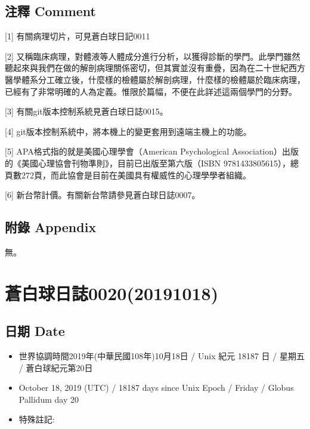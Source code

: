 \documentclass[a5paper, 12pt
]{book}
\providecommand{\tightlist}{%
  \setlength{\itemsep}{0pt}\setlength{\parskip}{0pt}}
\begin{document}
\hypertarget{ux6ce8ux91cb-comment-12}{%
\subsection{注釋 Comment}\label{ux6ce8ux91cb-comment-12}}

{[}1{]} 有關病理切片，可見蒼白球日記0011

{[}2{]}
又稱臨床病理，對體液等人體成分進行分析，以獲得診斷的學門。此學門雖然聽起來與我們在做的解剖病理關係密切，但其實並沒有重疊，因為在二十世紀西方醫學體系分工確立後，什麼樣的檢體屬於解剖病理，什麼樣的檢體屬於臨床病理，已經有了非常明確的人為定義。惟限於篇幅，不便在此詳述這兩個學門的分野。

{[}3{]} 有關git版本控制系統見蒼白球日誌0015。

{[}4{]} git版本控制系統中，將本機上的變更套用到遠端主機上的功能。

{[}5{]} APA格式指的就是美國心理學會（American Psychological
Association）出版的《美國心理協會刊物準則》，目前已出版至第六版（ISBN
9781433805615），總頁數272頁，而此協會是目前在美國具有權威性的心理學學者組織。

{[}6{]} 新台幣計價。有關新台幣請參見蒼白球日誌0007。

\hypertarget{ux9644ux9304-appendix-11}{%
\subsection{附錄 Appendix}\label{ux9644ux9304-appendix-11}}

無。

\hypertarget{ux84bcux767dux7403ux65e5ux8a8c002020191018}{%
\section{蒼白球日誌0020(20191018)}\label{ux84bcux767dux7403ux65e5ux8a8c002020191018}}

\hypertarget{ux65e5ux671f-date-19}{%
\subsection{日期 Date}\label{ux65e5ux671f-date-19}}

\begin{itemize}
\tightlist
\item
  世界協調時間2019年(中華民國108年)10月18日 / Unix 紀元 18187 日 /
  星期五 / 蒼白球紀元第20日
\item
  October 18, 2019 (UTC) / 18187 days since Unix Epoch / Friday / Globus
  Pallidum day 20
\item
  特殊註記:
\end{itemize}
\end{document}
